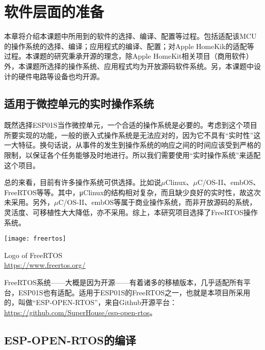 \setchapterpreamble[u]{\margintoc}
\chapter{软件层面的准备}

\setlength\parindent{2em} 本章将介绍本课题中所用到的软件的选择、编译、配置等过程。包括适配该MCU的操作系统的选择、编译；应用程式的编译、配置；对Apple HomeKik的适配等过程。本课题的研究秉承开源的理念，除Apple HomeKit相关项目（商用软件）外，本课题所选择的操作系统、应用程式均为开放源码软件系统。另，本课题中设计的硬件电路等设备也均开源。

\section{适用于微控单元的实时操作系统}

\setlength\parindent{2em} 既然选择ESP01S当作微控单元，一个合适的操作系统是必要的。考虑到这个项目所要实现的功能，一般的嵌入式操作系统是无法应对的，因为它不具有“实时性”这一大特征。换句话说，从事件的发生到操作系统的响应之间的时间应该受到严格的限制，以保证各个任务能够及时地进行。所以我们需要使用“实时操作系统”来适配这个项目。

\par 总的来看，目前有许多操作系统可供选择。比如说$\mu$Clinux、$\mu$C/OS-II、embOS、FreeRTOS等等。其中，μClinux的结构相对复杂，而且缺少良好的实时性，故这次未采用。另外，$\mu$C/OS-II、embOS等属于商业操作系统，而非开放源码的系统，灵活度、可移植性大大降低，亦不采用。综上，本研究项目选择了FreeRTOS操作系统。

\begin{marginfigure}[-0.5cm]
	\texttt{[image: freertos]}
	\caption[freertos]{Logo of FreeRTOS\\
	\url{https://www.freertos.org/}}
\end{marginfigure}


\par FreeRTOS系统——大概是因为开源——有着诸多的移植版本，几乎适配所有平台，ESP01S也有适配。适用于ESP01S的FreeRTOS之一，也就是本项目所采用的，叫做“ESP-OPEN-RTOS”，来自Github开源平台：\\
\url{https://github.com/SuperHouse/esp-open-rtos}。

\section{ESP-OPEN-RTOS的编译}

